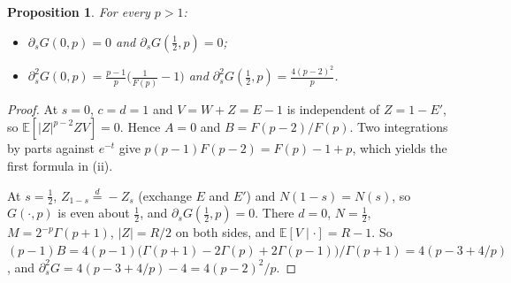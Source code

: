 \documentclass[11pt]{article}
\newtheorem{proposition}[theorem]{Proposition}
\theoremstyle{remark}
\newcommand{\E}{\mathbb E}
\begin{document}
\begin{proposition}\label{prop:endpoints}
For every $p>1$:
\begin{itemize}
\item[(i)] $\partial_sG(0,p)=0$ and $\partial_sG(\frac12,p)=0$;
\item[(ii)] $\partial_s^2G(0,p)=\frac{p-1}p\bigl(\frac1{F(p)}-1\bigr)$ and $\partial_s^2G(\frac12,p)=\frac{4(p-2)^2}p$.
\end{itemize}
\end{proposition}
\begin{proof}
At $s=0$, $c=d=1$ and $V=W+Z=E-1$ is independent of $Z=1-E'$, so $\E[|Z|^{p-2}ZV]=0$. Hence $A=0$ and $B=F(p-2)/F(p)$. Two integrations by parts against $e^{-t}$ give $p(p-1)F(p-2)=F(p)-1+p$, which yields the first formula in (ii).

At $s=\frac12$, $Z_{1-s}\overset d=-Z_s$ (exchange $E$ and $E'$) and $N(1-s)=N(s)$, so $G(\cdot,p)$ is even about $\frac12$, and $\partial_sG(\frac12,p)=0$. There $d=0$, $N=\frac12$, $M=2^{-p}\Gamma(p+1)$, $|Z|=R/2$ on both sides, and $\E[V\mid\cdot]=R-1$. So $(p-1)B=4(p-1)\bigl(\Gamma(p+1)-2\Gamma(p)+2\Gamma(p-1)\bigr)/\Gamma(p+1)=4(p-3+4/p)$, and $\partial_s^2G=4(p-3+4/p)-4=4(p-2)^2/p$.
\end{proof}
\end{document}
